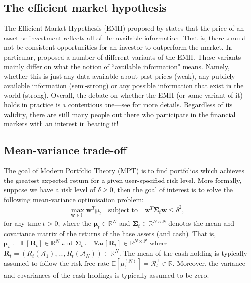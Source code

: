 \documentclass[12pt]{article}
\begin{document}
\subsection{The efficient market hypothesis}
The Efficient-Market Hypothesis (EMH) proposed by \cite{fama1970jf} states that the price of an asset or investment reflects all of the available information. That is, there should not be consistent opportunities for an investor to outperform the market. In particular, \cite{fama1970jf} proposed a number of different variants of the EMH. These variants mainly differ on what the notion of ``available information" means. Namely, whether this is just any data available about past prices (weak), any publicly available information (semi-strong) or any possible information that exist in the world (strong). Overall, the debate on whether the EMH (or some variant of it) holds in practice is a contentious one---see \cite{malkiel2003jep} for more details. Regardless of its validity, there are still many people out there who participate in the financial markets with an interest in beating it!
\subsection{Mean-variance trade-off}
\label{sec:mean_variance}
The goal of Modern Portfolio Theory (MPT) \citep{markowitz1952jf} is to find portfolios which achieves the greatest expected return for a given user-specified risk level. More formally, suppose we have a risk level of $\delta \geq 0$, then the goal of interest is to solve the following mean-variance optimisation problem:
\begin{align}
	\max_{\mathbf{w} \in \mathbb{H}} \mathbf{w}^T \boldsymbol{\mu}_t
	\quad
	\text{subject to}
	\quad 
	\mathbf{w}^T\boldsymbol{\Sigma}_t \mathbf{w} \leq \delta^2,
	\label{eqn:mean_variance_problem}
\end{align}
for any time $t > 0$, where the $\boldsymbol{\mu}_t \in \mathbb{R}^N$ and $\boldsymbol{\Sigma}_t \in \mathbb{R}^{N \times N}$ denotes the mean and covariance matrix of the returns of the base assets (and cash). That is, $\boldsymbol{\mu}_t := \mathbb{E}[\mathbf{R}_t] \in \mathbb{R}^N$ and $\boldsymbol{\Sigma}_t := \mathbb{V}\text{ar}[\mathbf{R}_t] \in \mathbb{R}^{N \times N}$ where $\mathbf{R}_t = (R_t(\mathcal{A}_1), \dots, R_t(\mathcal{A}_N)) \in \mathbb{R}^N$. The mean of the cash holding is typically assumed to follow the risk-free rate $\mathbb{E}[\mu_t^{(N)}] = \mathcal{R}_t^{\text{rf}} \in \mathbb{R}$. Moreover, the variance and covariances of the cash holdings is typically assumed to be zero.
\end{document}
